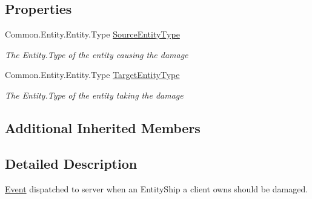 \subsection*{Properties}
\begin{DoxyCompactItemize}
\item 
Common.\-Entity.\-Entity.\-Type \hyperlink{class_skyrates_1_1_client_1_1_network_1_1_event_1_1_event_request_entity_ship_damaged_ad37861cbfed0eaf3c184b7b5a0fc1c34}{Source\-Entity\-Type}
\begin{DoxyCompactList}\small\item\em The Entity.\-Type of the entity causing the damage \end{DoxyCompactList}\item 
Common.\-Entity.\-Entity.\-Type \hyperlink{class_skyrates_1_1_client_1_1_network_1_1_event_1_1_event_request_entity_ship_damaged_a354ad9e86575579cb021377c64f28ec6}{Target\-Entity\-Type}
\begin{DoxyCompactList}\small\item\em The Entity.\-Type of the entity taking the damage \end{DoxyCompactList}\end{DoxyCompactItemize}
\subsection*{Additional Inherited Members}


\subsection{Detailed Description}
\hyperlink{namespace_skyrates_1_1_client_1_1_network_1_1_event}{Event} dispatched to server when an Entity\-Ship a client owns should be damaged. 



